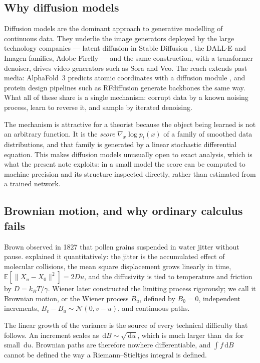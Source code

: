\documentclass[11pt,a4paper]{article}
\newcommand{\E}{\mathbb{E}}
\newcommand{\N}{\mathcal{N}}
\newcommand{\dd}{\,\mathrm d}
\begin{document}
\subsection{Why diffusion models}\label{sec:why-diffusion}

Diffusion models are the dominant approach to generative modelling of continuous data. They
underlie the image generators deployed by the large technology companies --- latent diffusion
in Stable Diffusion \citep{rombach2022latent}, the DALL$\cdot$E and Imagen families, Adobe
Firefly --- and the same construction, with a transformer denoiser, drives video generators
such as Sora and Veo. The reach extends past media: AlphaFold~3 predicts atomic coordinates
with a diffusion module \citep{abramson2024alphafold3}, and protein design pipelines such as
RFdiffusion generate backbones the same way. What all of these share is a single mechanism:
corrupt data by a known noising process, learn to reverse it, and sample by iterated
denoising.

The mechanism is attractive for a theorist because the object being learned is not an
arbitrary function. It is the \emph{score} $\nabla_x\log p_t(x)$ of a family of smoothed
data distributions, and that family is generated by a linear stochastic differential
equation. This makes diffusion models unusually open to exact analysis, which is what the
present note exploits: in a small model the score can be computed to machine precision and
its structure inspected directly, rather than estimated from a trained network.

\subsection{Brownian motion, and why ordinary calculus fails}\label{sec:brownian}

Brown observed in 1827 that pollen grains suspended in water jitter without pause.
\citet{einstein1905brownian} explained it quantitatively: the jitter is the accumulated effect
of molecular collisions, the mean square displacement grows linearly in time,
$\E[\|X_u-X_0\|^2]=2Du$, and the diffusivity is tied to temperature and friction by
$D=k_BT/\gamma$. Wiener later constructed the limiting process rigorously; we call it
Brownian motion, or the Wiener process $B_u$, defined by $B_0=0$, independent increments,
$B_v-B_u\sim\N(0,v-u)$, and continuous paths.

The linear growth of the variance is the source of every technical difficulty that follows.
An increment scales as $\dd B\sim\sqrt{\dd u}$, which is much larger than $\dd u$ for small
$\dd u$. Brownian paths are therefore nowhere differentiable, and $\int f\dd B$ cannot be
defined the way a Riemann--Stieltjes integral is defined.
\end{document}

